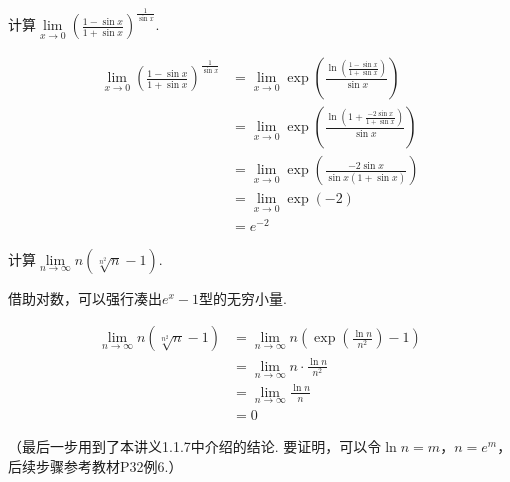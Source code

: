 \begin{example}
\label{ex:ch01-13}
计算$\lim\limits_{x \to 0}\left ( \displaystyle\frac{1-\sin x}{1+\sin x}\right )^{\frac{1}{\sin{x}}}$.
\end{example}

\begin{solution}
\begin{equation}
    \begin{aligned}
        \lim\limits_{x \to 0}\left ( \displaystyle\frac{1-\sin x}{1+\sin x}\right )^{\frac{1}{\sin{x}}}
        &= \lim\limits_{x \to 0}\exp\left (\frac{\ln(\frac{1-\sin x}{1+\sin x})}{\sin x} \right ) \\
        &= \lim\limits_{x \to 0}\exp\left (\frac{\ln(1+\frac{-2\sin x}{1+\sin x})}{\sin x} \right ) \\
        &= \lim\limits_{x \to 0}\exp\left (\frac{-2\sin x}{\sin x(1+\sin x)} \right ) \\
        &= \lim\limits_{x \to 0}\exp(-2)\\
        &= e^{-2}
        \nonumber
    \end{aligned}
\end{equation}
\end{solution}

\begin{example}
\label{ex:ch01-14}
计算$\lim\limits_{n \to \infty}n(\sqrt[n^{2}]{n}-1)$.
\end{example}

\begin{analysis}
借助对数，可以强行凑出$e^{x}-1$型的无穷小量.
\end{analysis}

\begin{solution}
\begin{equation}
    \begin{aligned}
        \lim\limits_{n \to \infty}n(\sqrt[n^{2}]{n}-1)
        &= \lim\limits_{n \to \infty}n\left(\exp\left (\frac{\ln n}{n^{2}} \right )-1\right) \\
        &= \lim\limits_{n \to \infty}n\cdot \frac{\ln n}{n^{2}} \\
        &= \lim\limits_{n \to \infty}\frac{\ln n}{n} \\
        &= 0
        \nonumber
    \end{aligned}
\end{equation} \par
（最后一步用到了本讲义1.1.7中介绍的结论. 要证明，可以令$\ln n=m$，$n = e^{m}$，后续步骤参考教材P32例6.）
\end{solution}

